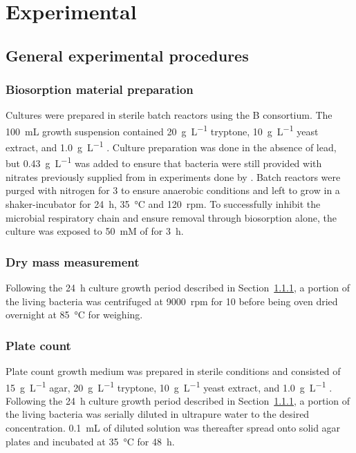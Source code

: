 \chapter{Experimental}

\section{General experimental procedures}

\subsection{Biosorption material preparation}
\label{sec:innoc}

Cultures were prepared in sterile batch reactors using the B consortium. The \SI{100}{\milli\liter} growth suspension contained \SI{20}{\gram\per\liter} tryptone, \SI{10}{\gram\per\liter} yeast extract, and \SI{1.0}{\gram\per\liter}  \parencite{Horstmann2020}. Culture preparation was done in the absence of lead, but \SI{0.43}{\gram\per\liter}  was added to ensure that bacteria were still provided with nitrates previously supplied from  in experiments done by \textcite{Horstmann2020}. Batch reactors were purged with nitrogen for \SI{3}{\min} to ensure anaerobic conditions \parencite{Peens2018b} and left to grow in a shaker-incubator for \SI{24}{\hour}, \SI{35}{\degreeCelsius} and \SI{120}{rpm}. To successfully inhibit the microbial respiratory chain and ensure  removal through biosorption alone, the culture was exposed to \SI{50}{\milli M} of   \parencite{Cabrol2017} for \SI{3}{\hour}.

\subsection{Dry mass measurement}

Following the \SI{24}{\hour} culture growth period described in Section~\ref{sec:innoc}, a portion of the living bacteria was centrifuged at \SI{9000}{rpm} for \SI{10}{\min} before being oven dried overnight at \SI{85}{\degreeCelsius} for weighing.

\subsection{Plate count}

Plate count growth medium was prepared in sterile conditions and consisted of \SI{15}{\gram\per\liter} agar, \SI{20}{\gram\per\liter} tryptone, \SI{10}{\gram\per\liter} yeast extract, and \SI{1.0}{\gram\per\liter} . Following the \SI{24}{\hour} culture growth period described in Section~\ref{sec:innoc}, a portion of the living bacteria was serially diluted in ultrapure water to the desired concentration. \SI{0.1}{\milli\liter} of diluted solution was thereafter spread onto solid agar plates and incubated at \SI{35}{\degreeCelsius} for \SI{48}{\hour}.

